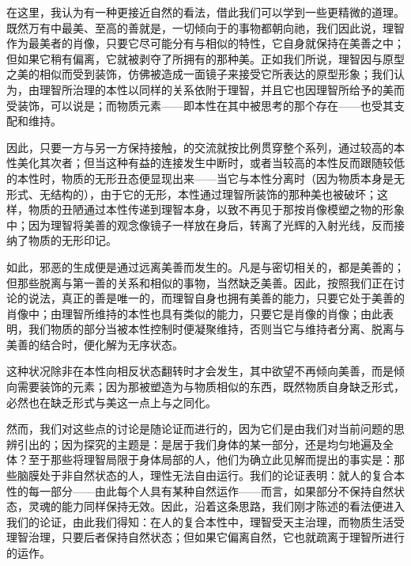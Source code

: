 在这里，我认为有一种更接近自然的看法，借此我们可以学到一些更精微的道理。既然万有中最美、至高的善就是，一切倾向于的事物都朝向祂，我们因此说，理智作为最美者的肖像，只要它尽可能分有与相似的特性，它自身就保持在美善之中；但如果它稍有偏离，它就被剥夺了所拥有的那种美。正如我们所说，理智因与原型之美的相似而受到装饰，仿佛被造成一面镜子来接受它所表达的原型形象；我们认为，由理智所治理的本性以同样的关系依附于理智，并且它也因理智所给予的美而受装饰，可以说是；而物质元素——即本性在其中被思考的那个存在——也受其支配和维持。\par

因此，只要一方与另一方保持接触，的交流就按比例贯穿整个系列，通过较高的本性美化其次者；但当这种有益的连接发生中断时，或者当较高的本性反而跟随较低的本性时，物质的无形丑态便显现出来——当它与本性分离时（因为物质本身是无形式、无结构的），由于它的无形，本性通过理智所装饰的那种美也被破坏；这样，物质的丑陋通过本性传递到理智本身，以致不再见于那按肖像模塑之物的形象中；因为理智将美善的观念像镜子一样放在身后，转离了光辉的入射光线，反而接纳了物质的无形印记。\par

如此，邪恶的生成便是通过远离美善而发生的。凡是与密切相关的，都是美善的；但那些脱离与第一善的关系和相似的事物，当然缺乏美善。因此，按照我们正在讨论的说法，真正的善是唯一的，而理智自身也拥有美善的能力，只要它处于美善的肖像中；由理智所维持的本性也具有类似的能力，只要它是肖像的肖像；由此表明，我们物质的部分当被本性控制时便凝聚维持，否则当它与维持者分离、脱离与美善的结合时，便化解为无序状态。\par

这种状况除非在本性向相反状态翻转时才会发生，其中欲望不再倾向美善，而是倾向需要装饰的元素；因为那被塑造为与物质相似的东西，既然物质自身缺乏形式，必然也在缺乏形式与美这一点上与之同化。\par

然而，我们对这些点的讨论是随论证而进行的，因为它们是由我们对当前问题的思辨引出的；因为探究的主题是：是居于我们身体的某一部分，还是均匀地遍及全体？至于那些将理智局限于身体局部的人，他们为确立此见解而提出的事实是：那些脑膜处于非自然状态的人，理性无法自由运行。我们的论证表明：就人的复合本性的每一部分——由此每个人具有某种自然运作——而言，如果部分不保持自然状态，灵魂的能力同样保持无效。因此，沿着这条思路，我们刚才陈述的看法便进入我们的论证，由此我们得知：在人的复合本性中，理智受天主治理，而物质生活受理智治理，只要后者保持自然状态；但如果它偏离自然，它也就疏离于理智所进行的运作。\par

